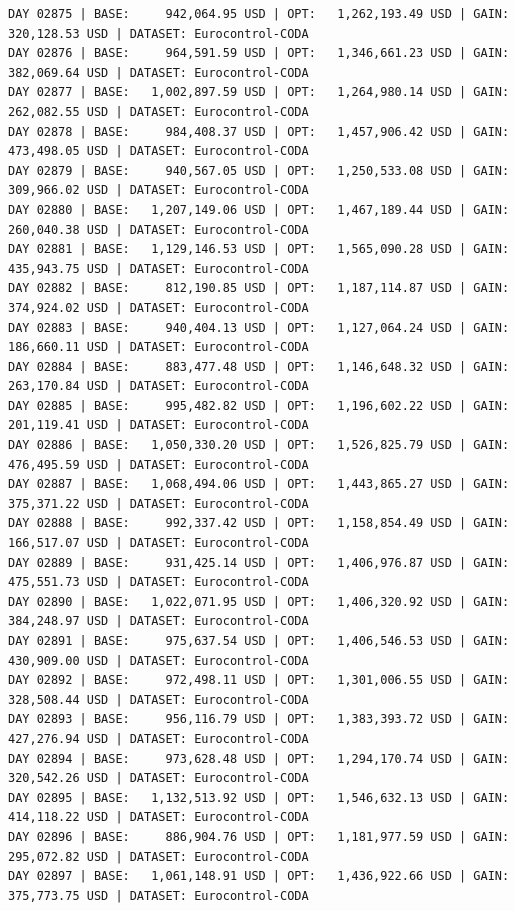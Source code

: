 \documentclass[11pt,a4paper]{article}
\begin{document}
\begin{verbatim}
DAY 02875 | BASE:     942,064.95 USD | OPT:   1,262,193.49 USD | GAIN: 320,128.53 USD | DATASET: Eurocontrol-CODA
DAY 02876 | BASE:     964,591.59 USD | OPT:   1,346,661.23 USD | GAIN: 382,069.64 USD | DATASET: Eurocontrol-CODA
DAY 02877 | BASE:   1,002,897.59 USD | OPT:   1,264,980.14 USD | GAIN: 262,082.55 USD | DATASET: Eurocontrol-CODA
DAY 02878 | BASE:     984,408.37 USD | OPT:   1,457,906.42 USD | GAIN: 473,498.05 USD | DATASET: Eurocontrol-CODA
DAY 02879 | BASE:     940,567.05 USD | OPT:   1,250,533.08 USD | GAIN: 309,966.02 USD | DATASET: Eurocontrol-CODA
DAY 02880 | BASE:   1,207,149.06 USD | OPT:   1,467,189.44 USD | GAIN: 260,040.38 USD | DATASET: Eurocontrol-CODA
DAY 02881 | BASE:   1,129,146.53 USD | OPT:   1,565,090.28 USD | GAIN: 435,943.75 USD | DATASET: Eurocontrol-CODA
DAY 02882 | BASE:     812,190.85 USD | OPT:   1,187,114.87 USD | GAIN: 374,924.02 USD | DATASET: Eurocontrol-CODA
DAY 02883 | BASE:     940,404.13 USD | OPT:   1,127,064.24 USD | GAIN: 186,660.11 USD | DATASET: Eurocontrol-CODA
DAY 02884 | BASE:     883,477.48 USD | OPT:   1,146,648.32 USD | GAIN: 263,170.84 USD | DATASET: Eurocontrol-CODA
DAY 02885 | BASE:     995,482.82 USD | OPT:   1,196,602.22 USD | GAIN: 201,119.41 USD | DATASET: Eurocontrol-CODA
DAY 02886 | BASE:   1,050,330.20 USD | OPT:   1,526,825.79 USD | GAIN: 476,495.59 USD | DATASET: Eurocontrol-CODA
DAY 02887 | BASE:   1,068,494.06 USD | OPT:   1,443,865.27 USD | GAIN: 375,371.22 USD | DATASET: Eurocontrol-CODA
DAY 02888 | BASE:     992,337.42 USD | OPT:   1,158,854.49 USD | GAIN: 166,517.07 USD | DATASET: Eurocontrol-CODA
DAY 02889 | BASE:     931,425.14 USD | OPT:   1,406,976.87 USD | GAIN: 475,551.73 USD | DATASET: Eurocontrol-CODA
DAY 02890 | BASE:   1,022,071.95 USD | OPT:   1,406,320.92 USD | GAIN: 384,248.97 USD | DATASET: Eurocontrol-CODA
DAY 02891 | BASE:     975,637.54 USD | OPT:   1,406,546.53 USD | GAIN: 430,909.00 USD | DATASET: Eurocontrol-CODA
DAY 02892 | BASE:     972,498.11 USD | OPT:   1,301,006.55 USD | GAIN: 328,508.44 USD | DATASET: Eurocontrol-CODA
DAY 02893 | BASE:     956,116.79 USD | OPT:   1,383,393.72 USD | GAIN: 427,276.94 USD | DATASET: Eurocontrol-CODA
DAY 02894 | BASE:     973,628.48 USD | OPT:   1,294,170.74 USD | GAIN: 320,542.26 USD | DATASET: Eurocontrol-CODA
DAY 02895 | BASE:   1,132,513.92 USD | OPT:   1,546,632.13 USD | GAIN: 414,118.22 USD | DATASET: Eurocontrol-CODA
DAY 02896 | BASE:     886,904.76 USD | OPT:   1,181,977.59 USD | GAIN: 295,072.82 USD | DATASET: Eurocontrol-CODA
DAY 02897 | BASE:   1,061,148.91 USD | OPT:   1,436,922.66 USD | GAIN: 375,773.75 USD | DATASET: Eurocontrol-CODA

\end{verbatim}
\end{document}
